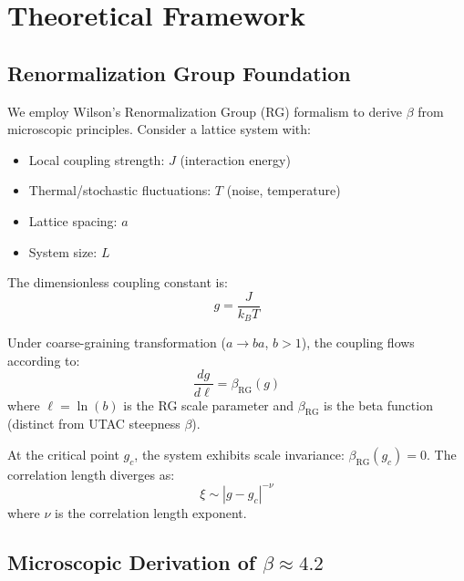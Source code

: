 \documentclass[11pt,a4paper]{article}
\begin{document}
\section{Theoretical Framework}
\label{sec:theory}

\subsection{Renormalization Group Foundation}

We employ Wilson's Renormalization Group (RG) formalism \cite{Wilson1971,Wilson1974,Fisher1998} to derive $\beta$ from microscopic principles. Consider a lattice system with:

\begin{itemize}
\item Local coupling strength: $J$ (interaction energy)
\item Thermal/stochastic fluctuations: $T$ (noise, temperature)
\item Lattice spacing: $a$
\item System size: $L$
\end{itemize}

The dimensionless coupling constant is:
\begin{equation}
g = \frac{J}{k_B T}
\label{eq:coupling}
\end{equation}

Under coarse-graining transformation ($a \to ba$, $b > 1$), the coupling flows according to:
\begin{equation}
\frac{dg}{d\ell} = \beta_{\text{RG}}(g)
\label{eq:rg_flow}
\end{equation}
where $\ell = \ln(b)$ is the RG scale parameter and $\beta_{\text{RG}}$ is the beta function (distinct from UTAC steepness $\beta$).

At the critical point $g_c$, the system exhibits scale invariance: $\beta_{\text{RG}}(g_c) = 0$. The correlation length diverges as:
\begin{equation}
\xi \sim |g - g_c|^{-\nu}
\label{eq:correlation}
\end{equation}
where $\nu$ is the correlation length exponent.

\subsection{Microscopic Derivation of $\beta \approx 4.2$}
\end{document}
